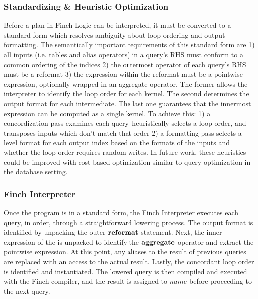 
\subsubsection{Standardizing \& Heuristic Optimization}
Before a plan in Finch Logic can be interpreted, it must be converted to a standard form which resolves ambiguity about loop ordering and output formatting. The semantically important requirements of this standard form are 1) all inputs (i.e. tables and alias operators) in a query's RHS must conform to a common ordering of the indices 2) the outermost operator of each query's RHS must be a reformat 3) the expression within the reformat must be a pointwise expression, optionally wrapped in an aggregate operator. The former allows the interpreter to identify the loop order for each kernel. The second determines the output format for each intermediate. The last one guarantees that the innermost expression can be computed as a single kernel. To achieve this: 1) a concordization pass examines each query, heuristically selects a loop order, and transposes inputs which don't match that order 2) a formatting pass selects a level format for each output index based on the formats of the inputs and whether the loop order requires random writes. In future work, these heuristics could be improved with cost-based optimization similar to query optimization in the database setting.


\subsubsection{Finch Interpreter} 
Once the program is in a standard form, the Finch Interpreter executes each query, in order, through a straightforward lowering process. The output format is identified by unpacking the outer $\text{\textbf{reformat}}$ statement. Next, the inner expression of the is unpacked to identify the $\text{\textbf{aggregate}}$ operator and extract the pointwise expression. At this point, any aliases to the result of previous queries are replaced with an access to the actual result. Lastly, the concordant loop order is identified and instantiated. The lowered query is then compiled and executed with the Finch compiler, and the result is assigned to $name$ before proceeding to the next query. 


